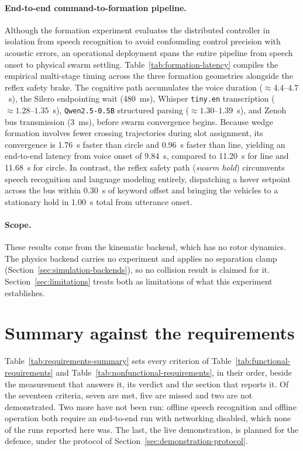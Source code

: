 \paragraph{End-to-end command-to-formation pipeline.}
Although the formation experiment evaluates the distributed controller in isolation from speech recognition to avoid confounding control precision with acoustic errors, an operational deployment spans the entire pipeline from speech onset to physical swarm settling. Table~\ref{tab:formation-latency} compiles the empirical multi-stage timing across the three formation geometries alongside the reflex safety brake. The cognitive path accumulates the voice duration ($\approx 4.4$--$4.7$~s), the Silero endpointing wait (480~ms), Whisper \texttt{tiny.en} transcription ($\approx 1.28$--$1.35$~s), \texttt{Qwen2.5-0.5B} structured parsing ($\approx 1.30$--$1.39$~s), and Zenoh bus transmission (3~ms), before swarm convergence begins. Because wedge formation involves fewer crossing trajectories during slot assignment, its convergence is 1.76~s faster than circle and 0.96~s faster than line, yielding an end-to-end latency from voice onset of 9.84~s, compared to 11.20~s for line and 11.68~s for circle. In contrast, the reflex safety path (\emph{swarm hold}) circumvents speech recognition and language modeling entirely, dispatching a hover setpoint across the bus within 0.30~s of keyword offset and bringing the vehicles to a stationary hold in 1.00~s total from utterance onset.



\paragraph{Scope.} These results come from the kinematic backend, which has no rotor dynamics. The
physics backend carries no experiment and applies no separation clamp
(Section~\ref{sec:simulation-backends}), so no collision result is claimed for it.
Section~\ref{sec:limitations} treats both as limitations of what this experiment establishes.

\section{Summary against the requirements}
\label{sec:requirements-summary}
Table~\ref{tab:requirements-summary} sets every criterion of
Table~\ref{tab:functional-requirements} and Table~\ref{tab:nonfunctional-requirements}, in their
order, beside the measurement that answers it, its verdict and the section that reports it. Of the
seventeen criteria, seven are met, five are missed and two are not demonstrated. Two more have not
been run: offline speech recognition and offline operation both require an end-to-end run with
networking disabled, which none of the runs reported here was. The last, the live demonstration,
is planned for the defence, under the protocol of Section~\ref{sec:demonstration-protocol}.

